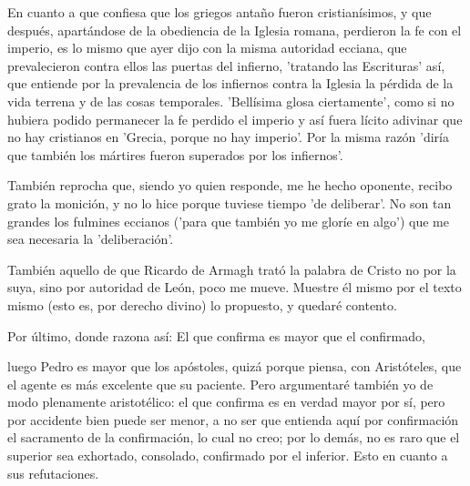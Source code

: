 En cuanto a que confiesa que los griegos antaño fueron cristianísimos, y que después, apartándose de la obediencia de la Iglesia romana, perdieron la fe con el imperio, es lo mismo que ayer dijo con la misma autoridad ecciana, que prevalecieron contra ellos las puertas del infierno, 'tratando las Escrituras' así, que entiende por la prevalencia de los infiernos contra la Iglesia la pérdida de la vida terrena y de las cosas temporales. 'Bellísima glosa ciertamente', como si no hubiera podido permanecer la fe perdido el imperio y así fuera lícito adivinar que no hay cristianos en 'Grecia, porque no hay imperio'. Por la misma razón 'diría que también los mártires fueron superados por los infiernos'.

También reprocha que, siendo yo quien responde, me he hecho oponente, recibo grato la monición, y no lo hice porque tuviese tiempo 'de deliberar'. No son tan grandes los fulmines eccianos ('para que también yo me gloríe en algo') que me sea necesaria la 'deliberación'.

También aquello de que Ricardo de Armagh trató la palabra de Cristo no por la suya, sino por autoridad de León, poco me mueve. Muestre él mismo por el texto mismo (esto es, por derecho divino) lo propuesto, y quedaré contento.

Por último, donde razona así: El que confirma es mayor que el confirmado,

luego Pedro es mayor que los apóstoles, quizá porque piensa, con Aristóteles, que el agente es más excelente que su paciente. Pero argumentaré también yo de modo plenamente aristotélico: el que confirma es en verdad mayor por sí, pero por accidente bien puede ser menor, a no ser que entienda aquí por confirmación el sacramento de la confirmación, lo cual no creo; por lo demás, no es raro que el superior sea exhortado, consolado, confirmado por el inferior. Esto en cuanto a sus refutaciones.

